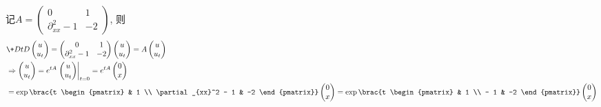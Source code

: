 \documentclass[hidelinks]{ctexart}
\begin{document}
\begin{solution}
    记$\displaystyle A = \begin{pmatrix}
        0 & 1 \\
        \partial_{xx}^2 - 1 & -2
    \end{pmatrix}$, 则
    \begin{align*}
        & \+DtD{} \begin{pmatrix}
            u \\ u_t
        \end{pmatrix} = \begin{pmatrix}
        0 & 1 \\
        \partial_{xx}^2 - 1 & -2
    \end{pmatrix}\begin{pmatrix}
        u \\ u_t
    \end{pmatrix} = A \begin{pmatrix}
        u \\ u_t
    \end{pmatrix} \\
        &\Rightarrow\begin{pmatrix}
            u \\ u_t
        \end{pmatrix} = e^{tA}\left.\begin{pmatrix}
        u \\ u_t
    \end{pmatrix}\right\vert_{t=0}
        = e^{tA}\begin{pmatrix}
            0 \\ x
        \end{pmatrix}\\ 
        &= \exp \brac{t \begin{pmatrix}
            & 1 \\
            \partial_{xx}^2 - 1 & -2
        \end{pmatrix}} \begin{pmatrix}
            0 \\ x
        \end{pmatrix} = \exp \brac{t \begin{pmatrix}
            & 1 \\
            - 1 & -2
        \end{pmatrix}} \begin{pmatrix}
            0 \\ x
        \end{pmatrix} \\

\end{align*}
\end{solution}
\end{document}
